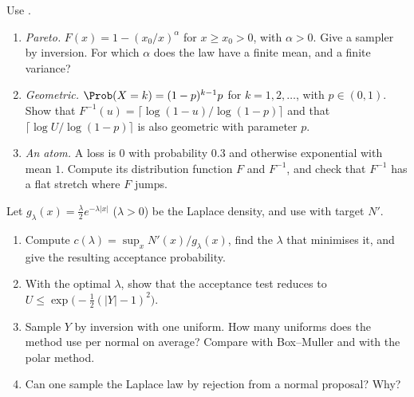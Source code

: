 \begin{exercise}\label{ex:rng-inversion-examples}
\easy Use .
\begin{enumerate}[label=(\alph*)]
  \item \emph{Pareto.} $F(x)=1-(x_0/x)^\alpha$ for $x\ge x_0>0$, with $\alpha>0$. Give a
    sampler by inversion. For which $\alpha$ does the law have a finite mean, and a finite
    variance?
  \item \emph{Geometric.} $\Prob(X=k)=(1-p)^{k-1}p$ for $k=1,2,\dots$, with $p\in(0,1)$. Show
    that $F^{-1}(u)=\lceil\log(1-u)/\log(1-p)\rceil$ and that
    $\lceil\log U/\log(1-p)\rceil$ is also geometric with parameter $p$.
  \item \emph{An atom.} A loss is $0$ with probability $0.3$ and otherwise exponential with
    mean $1$. Compute its distribution function $F$ and $F^{-1}$, and check that $F^{-1}$
    has a flat stretch where $F$ jumps.
\end{enumerate}
\end{exercise}

\begin{exercise}\label{ex:rng-laplace}
\medium Let $g_\lambda(x)=\frac\lambda2e^{-\lambda|x|}$ ($\lambda>0$) be the Laplace density,
and use  with target $N'$.
\begin{enumerate}[label=(\alph*)]
  \item Compute $c(\lambda)=\sup_xN'(x)/g_\lambda(x)$, find the $\lambda$ that minimises it,
    and give the resulting acceptance probability.
  \item With the optimal $\lambda$, show that the acceptance test reduces to
    $U\le\exp\big(-\frac12(|Y|-1)^2\big)$.
  \item Sample $Y$ by inversion with one uniform. How many uniforms does the method use per
    normal on average? Compare with Box--Muller and with the polar method.
  \item Can one sample the Laplace law by rejection from a normal proposal? Why?
\end{enumerate}
\end{exercise}

